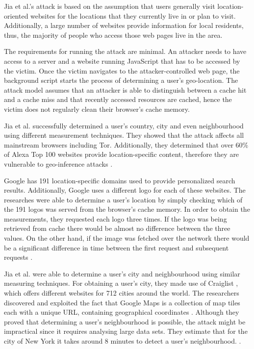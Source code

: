 \documentclass[10pt,a4paper,twoside]{book}
\begin{document}
Jia et al.'s \cite{jia2015know} attack is based on the assumption that users generally visit location-oriented websites for the locations that they currently live in or plan to visit. Additionally, a large number of websites provide information for local residents, thus, the majority of people who access those web pages live in the area. 

The requirements for running the attack are minimal. An attacker needs to have access to a server and a website running JavaScript that has to be accessed by the victim. Once the victim navigates to the attacker-controlled web page, the background script starts the process of determining a user's geo-location. The attack model assumes that an attacker is able to distinguish between a cache hit and a cache miss and that recently accessed resources are cached, hence the victim does not regularly clean their browser's cache memory.

Jia et al. \cite{jia2015know} successfully determined a user's country, city and even neighbourhood using different measurement techniques. They showed that the attack affects all mainstream browsers including Tor. Additionally, they determined that over 60\% of Alexa Top 100 \cite{alexa500} websites provide location-specific content, therefore they are vulnerable to geo-inference attacks \cite{jia2015know}.

Google has 191 location-specific domains used to provide personalized search results. Additionally, Google uses a different logo for each of these websites. The researches were able to determine a user's location by simply checking which of the 191 logos was served from the browser's cache memory. In order to obtain the measurements, they requested each logo three times. If the logo was being retrieved from cache there would be almost no difference between the three values. On the other hand, if the image was fetched over the network there would be a significant difference in time between the first request and subsequent requests \cite{jia2015know}.

Jia et al. \cite{jia2015know} were able to determine a user's city and neighbourhood using similar measuring techniques. For obtaining a user's city, they made use of Craiglist \cite{craiglist}, which offers different websites for 712 cities around the world. The researchers discovered and exploited the fact that Google Maps is a collection of map tiles each with a unique URL, containing geographical coordinates \cite{jia2015know}. Although they proved that determining a user's neighbourhood is possible, the attack might be impractical since it requires analysing large data sets. They estimate that for the city of New York it takes around 8 minutes to detect a user's neighbourhood. \cite{jia2015know}.
\end{document}
